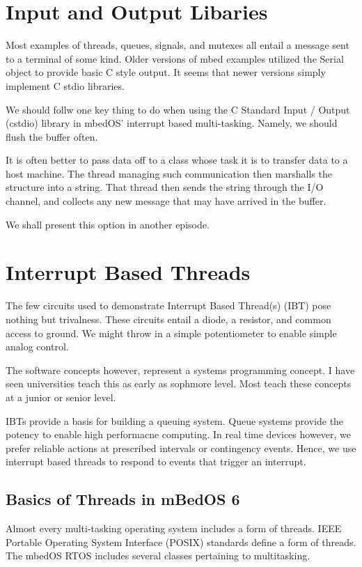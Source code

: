 \documentclass{article}
\begin{document}
\section{Input and Output Libaries} %
\label{sec:input_and_output_libaries}
Most examples of threads, queues, signals, and mutexes all entail a message sent to a terminal of some kind.  Older versions of mbed examples utilized the Serial object to provide basic C style output.  It seems that newer versions simply implement C stdio libraries.

We should follw one key thing to do when using the C Standard Input / Output (cstdio) library in mbedOS' interrupt based multi-tasking.  Namely, we should flush the buffer often.  

It is often better to pass data off to a class whose task it is to transfer data to a host machine.  The thread managing such communication then marshalls the structure into a string.  That thread then sends the string through the I/O channel, and collects any new message that may have arrived in the buffer.  

We shall present this option in another episode.


\section{Interrupt Based Threads} %
\label{sec:interrupt_based_threads}

The few circuits used to demonstrate Interrupt Based Thread(s) (IBT) pose nothing but trivalness.  These circuits entail a diode, a resistor, and common access to ground.  We might throw in a simple potentiometer to enable simple analog control.

The software concepts however, represent a systems programming concept.  I have seen universities teach this as early as sophmore level.  Most teach these concepts at a junior or senior level.  

IBTs provide a basis for building a queuing system.  Queue systems provide the potency to enable high performacne computing.  In real time devices however, we prefer reliable actions at prescribed intervals or contingency events.  Hence, we use interrupt based threads to respond to events that trigger an interrupt.


\subsection{Basics of Threads in mBedOS 6} %
\label{sub:basics_of_threads_in_mbedos_6}
Almost every multi-tasking operating system includes a form of threads.  IEEE Portable Operating System Interface (POSIX) standards define a form of threads.  The mbedOS RTOS includes several classes pertaining to multitasking.  
\end{document}
